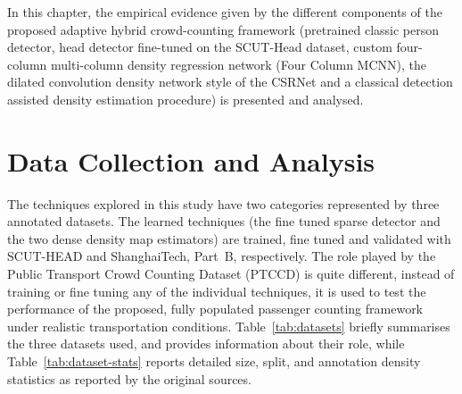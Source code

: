 \label{chap:results}

In this chapter, the empirical evidence given by the different components of the proposed adaptive hybrid crowd-counting framework (pretrained classic person detector, head detector fine-tuned on the SCUT-Head dataset, custom four-column multi-column density regression network (Four Column MCNN), the dilated convolution density network style of the CSRNet and a classical detection assisted density estimation procedure) is presented and analysed.

\section{Data Collection and Analysis}

The techniques explored in this study have two categories represented by three annotated datasets. The learned techniques (the fine tuned sparse detector and the two dense density map estimators) are trained, fine tuned and validated with SCUT-HEAD and ShanghaiTech, Part~B, respectively. The role played by the Public Transport Crowd Counting Dataset (PTCCD) is quite different, instead of training or fine tuning any of the individual techniques, it is used to test the performance of the proposed, fully populated passenger counting framework under realistic transportation conditions. Table~\ref{tab:datasets} briefly summarises the three datasets used, and provides information about their role, while Table~\ref{tab:dataset-stats} reports detailed size, split, and annotation density statistics as reported by the original sources.

